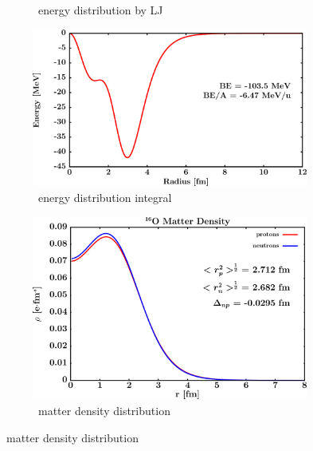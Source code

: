 \begin{figure}[hbtp]
\begin{subfigure}{0.45\textwidth}
        \caption{\oSix\ energy distribution by LJ}
        \label{DOMFitData_o16_proton_energyDistInt}
    \end{subfigure}\hspace{6pt}
    \begin{subfigure}{0.45\textwidth}
        \centering
        \includegraphics[width=\linewidth]{figures/o16_EnergyDistIntegral.png}
        \caption{\oSix\ energy distribution integral}
        \label{DOMFitData_o16_neutron_energyDistInt}
    \end{subfigure}\vspace{0.4in}
    \begin{subfigure}{0.70\textwidth}
        \centering
        \includegraphics[width=\linewidth]{figures/o16_matterDensity.png}
        \caption{\oSix\ matter density distribution}
        \label{DOMFitData_o16_matterDensity}
    \end{subfigure}
\end{figure}

